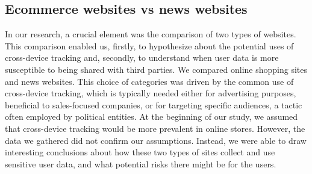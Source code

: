 \subsection{Ecommerce websites vs news websites}
In our research, a crucial element was the comparison of two types of websites. This comparison enabled us, firstly, to hypothesize about the potential uses of cross-device tracking and, secondly, to understand when user data is more susceptible to being shared with third parties. We compared online shopping sites and news websites. This choice of categories was driven by the common use of cross-device tracking, which is typically needed either for advertising purposes, beneficial to sales-focused companies, or for targeting specific audiences, a tactic often employed by political entities. At the beginning of our study, we assumed that cross-device tracking would be more prevalent in online stores. However, the data we gathered did not confirm our assumptions. Instead, we were able to draw interesting conclusions about how these two types of sites collect and use sensitive user data, and what potential risks there might be for the users.

